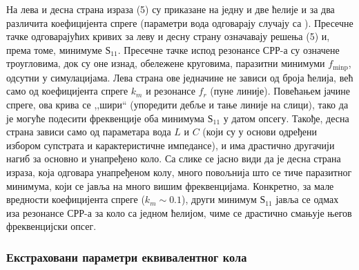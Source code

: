 На  лева и десна страна израза (5) су приказане на једну и две ћелије и за два различита коефицијента спреге (параметри вода одговарају случају са ). Пресечне тачке одговарајућих кривих за леву и десну страну означавају решења (5) и, према томе, минимуме $Ѕ_{11}$. Пресечне тачке испод резонансе СРР-а су означене троугловима, док су оне изнад, обележене круговима, паразитни минимуми $f_\text{minp}$, одсутни у симулацијама. Лева страна ове једначине не зависи од броја ћелија, већ само од коефицијента спреге $k_m$ и резонансе $f_r$ (пуне линије). Повећањем јачине спреге, ова крива се ,,шири`` (упоредити дебље и тање линије на слици), тако да је могуће подесити фреквенције оба минимума $Ѕ_{11}$ у датом опсегу. Такође, десна страна зависи само од параметара вода $L$ и $C$ (који су у основи одређени избором супстрата и карактеристичне импедансе), и има драстично другачији нагиб за основно и унапређено коло. Са слике се јасно види да је десна страна израза, која одговара унапређеном колу, много повољнија што се тиче паразитног минимума, који се јавља на много вишим фреквенцијама. Конкретно, за мале вредности коефицијента спреге ($k_m\sim \num{0.1}$), други минимум $Ѕ_{11}$ јавља се одмах иза резонансе СРР-а за коло са једном ћелијом, чиме се драстично смањује његов фреквенцијски опсег.

\subsubsection{Екстраховани параметри еквивалентног кола}

